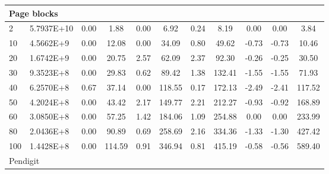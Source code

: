 {\begin{longtable}{@{}llccccccccc@{}}
\multicolumn{11}{l}{Page blocks}                                                                                                                                                                               \\ \hline
\multicolumn{1}{l|}{2}   & \multicolumn{1}{l|}{5.7937E+10} & 0.00 & \multicolumn{1}{c|}{1.88}    & 0.00 & \multicolumn{1}{c|}{6.92}    & 0.24 & \multicolumn{1}{c|}{8.19}    & 0.00      & 0.00      & 3.84    \\
\multicolumn{1}{l|}{10}  & \multicolumn{1}{l|}{4.5662E+9}  & 0.00 & \multicolumn{1}{c|}{12.08}   & 0.00 & \multicolumn{1}{c|}{34.09}   & 0.80 & \multicolumn{1}{c|}{49.62}   & -0.73     & -0.73     & 10.46   \\
\multicolumn{1}{l|}{20}  & \multicolumn{1}{l|}{1.6742E+9}  & 0.00 & \multicolumn{1}{c|}{20.75}   & 2.57 & \multicolumn{1}{c|}{62.09}   & 2.37 & \multicolumn{1}{c|}{92.30}   & -0.26     & -0.25     & 30.50   \\
\multicolumn{1}{l|}{30}  & \multicolumn{1}{l|}{9.3523E+8}  & 0.00 & \multicolumn{1}{c|}{29.83}   & 0.62 & \multicolumn{1}{c|}{89.42}   & 1.38 & \multicolumn{1}{c|}{132.41}  & -1.55     & -1.55     & 71.93   \\
\multicolumn{1}{l|}{40}  & \multicolumn{1}{l|}{6.2570E+8}  & 0.67 & \multicolumn{1}{c|}{37.14}   & 0.00 & \multicolumn{1}{c|}{118.55}  & 0.17 & \multicolumn{1}{c|}{172.13}  & -2.49     & -2.41     & 117.52  \\
\multicolumn{1}{l|}{50}  & \multicolumn{1}{l|}{4.2024E+8}  & 0.00 & \multicolumn{1}{c|}{43.42}   & 2.17 & \multicolumn{1}{c|}{149.77}  & 2.21 & \multicolumn{1}{c|}{212.27}  & -0.93     & -0.92     & 168.89  \\
\multicolumn{1}{l|}{60}  & \multicolumn{1}{l|}{3.0850E+8}  & 0.00 & \multicolumn{1}{c|}{57.25}   & 1.42 & \multicolumn{1}{c|}{184.06}  & 1.09 & \multicolumn{1}{c|}{254.88}  & 0.00      & 0.00      & 233.99  \\
\multicolumn{1}{l|}{80}  & \multicolumn{1}{l|}{2.0436E+8}  & 0.00 & \multicolumn{1}{c|}{90.89}   & 0.69 & \multicolumn{1}{c|}{258.69}  & 2.16 & \multicolumn{1}{c|}{334.36}  & -1.33     & -1.30     & 427.42  \\
\multicolumn{1}{l|}{100} & \multicolumn{1}{l|}{1.4428E+8}  & 0.00 & \multicolumn{1}{c|}{114.59}  & 0.91 & \multicolumn{1}{c|}{346.94}  & 0.81 & \multicolumn{1}{c|}{415.19}  & -0.58     & -0.56     & 589.40  \\ \hline
\multicolumn{11}{l}{Pendigit}                                                                                                                                                                                  \\ \hline

\end{longtable}}
